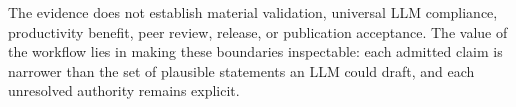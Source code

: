 \documentclass[11pt]{article}
\begin{document}
The evidence does not establish material validation, universal LLM compliance,
productivity benefit, peer review, release, or publication acceptance. The
value of the workflow lies in making these boundaries inspectable: each admitted
claim is narrower than the set of plausible statements an LLM could draft, and
each unresolved authority remains explicit.

\begingroup
\raggedright
\setlength{\bibsep}{0.5\baselineskip}


\endgroup
\end{document}
